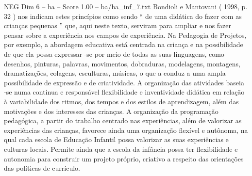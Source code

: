 \begin{textsample}{NEG Dim 6 – ba – Score 1.00 – ba/ba\_inf\_7.txt}
Bondioli e Mantovani ( 1998, p. 32 ) nos indicam estes princípios como sendo “ de uma didática do fazer com as crianças pequenas ” que, aqui neste texto, serviram para ampliar e nos fazer pensar sobre a experiência nos campos de experiência.
Na Pedagogia de Projetos, por exemplo, a abordagem educativa está centrada na criança e na possibilidade de que ela possa expressar -se por meio de todas as suas linguagens, como desenhos, pinturas, palavras, movimentos, dobraduras, modelagens, montagens, dramatizações, colagens, esculturas, músicas, o que a conduz a uma ampla possibilidade de expressão e de criatividade.
A organização das atividades baseia -se numa contínua e responsável flexibilidade e inventividade didática em relação à variabilidade dos ritmos, dos tempos e dos estilos de aprendizagem, além das motivações e dos interesses das crianças.
A organização da programação pedagógica, a partir do trabalho centrado nas experiências, além de valorizar as experiências das crianças, favorece ainda uma organização flexível e autônoma, na qual cada escola de Educação Infantil possa valorizar as suas experiências e culturas locais.
Permite ainda que a escola da infância possa ter flexibilidade e autonomia para construir um projeto próprio, criativo a respeito das orientações das políticas de currículo.

\end{textsample}
